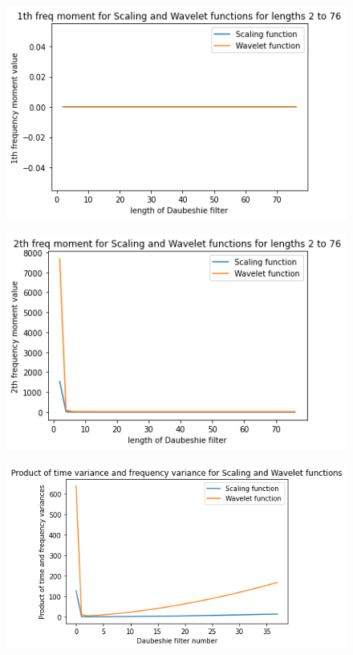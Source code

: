 \documentclass{article}
\begin{document}
\begin{figure}[H]
\begin{center}
\includegraphics[scale = 0.8]{1th_f.png}
\end{center}
\end{figure}

\begin{figure}[H]
\begin{center}
\includegraphics[scale = 0.8]{2nd_f.png}
\end{center}
\end{figure}

\begin{figure}[H]
\begin{center}
\includegraphics[scale = 0.8]{product2.png}
\end{center}
\end{figure}
\end{document}
